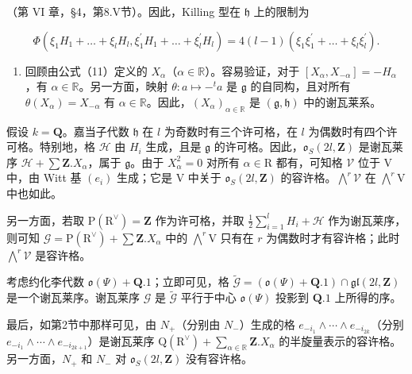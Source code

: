 （第 VI 章，§4，第8.V节）。因此，Killing 型在 \(\mathfrak{h}\) 上的限制为

\[
\Phi \left(\xi_ {1} H _ {1} + \dots + \xi_ {l} H _ {l}, \xi_ {1} ^ {\prime} H _ {1} + \dots + \xi_ {l} ^ {\prime} H _ {l}\right) = 4 (l - 1) \left(\xi_ {1} \xi_ {1} ^ {\prime} + \dots + \xi_ {l} \xi_ {l} ^ {\prime}\right).
\]

\begin{enumerate}
\def\labelenumi{(\Roman{enumi})}
\setcounter{enumi}{8}
\tightlist
\item
回顾由公式（11）定义的 \(X_{\alpha}\)（\(\alpha \in \mathbb{R}\)）。容易验证，对于 \([X_{\alpha}, X_{-\alpha}] = -H_{\alpha}\)，有 \(\alpha \in \mathbb{R}\)。另一方面，映射 \(\theta : a \mapsto -^{t}a\) 是 \(\mathfrak{g}\) 的自同构，且对所有 \(\theta(X_{\alpha}) = X_{-\alpha}\) 有 \(\alpha \in \mathbb{R}\)。因此，\((X_{\alpha})_{\alpha \in \mathbb{R}}\) 是 \((\mathfrak{g}, \mathfrak{h})\) 中的谢瓦莱系。
\end{enumerate}

假设 \(k = \mathbf{Q}\)。嘉当子代数 \(\mathfrak{h}\) 在 \(l\) 为奇数时有三个许可格，在 \(l\) 为偶数时有四个许可格。特别地，格 \(\mathcal{H}\) 由 \(H_i\) 生成，且是 \(\mathfrak{g}\) 的许可格。因此，\(\mathfrak{o}_S(2l,\mathbf{Z})\) 是谢瓦莱序 \(\mathcal{H} + \sum \mathbf{Z}.X_\alpha\)，属于 \(\mathfrak{g}\)。由于 \(X_{\alpha}^{2} = 0\) 对所有 \(\alpha \in \mathrm{R}\) 都有，可知格 \(\mathcal{V}\) 位于 \(\mathrm{V}\) 中，由 Witt 基 \((e_i)\) 生成；它是 \(\mathrm{V}\) 中关于 \(\mathfrak{o}_S(2l,\mathbf{Z})\) 的容许格。\(\bigwedge^r\mathcal{V}\) 在 \(\bigwedge^r\mathrm{V}\) 中也如此。

另一方面，若取 \(\mathrm{P}(\mathrm{R}^{\vee}) = \mathbf{Z}\) 作为许可格，并取 \(\frac{1}{2} \sum_{i=1}^{l} H_i + \mathcal{H}\) 作为谢瓦莱序，则可知 \(\mathcal{G} = \mathrm{P}(\mathrm{R}^{\vee}) + \sum \mathbf{Z}. X_{\alpha}\) 中的 \(\bigwedge^r \mathrm{V}\) 只有在 \(r\) 为偶数时才有容许格；此时 \(\bigwedge^r \mathcal{V}\) 是容许格。

考虑约化李代数 \(\mathfrak{o}(\varPsi) + \mathbf{Q}.1\)；立即可见，格 \(\tilde{\mathcal{G}} = (\mathfrak{o}(\varPsi) + \mathbf{Q}.1) \cap \mathfrak{gl}(2l, \mathbf{Z})\) 是一个谢瓦莱序。谢瓦莱序 \(\mathcal{G}\) 是 \(\tilde{\mathcal{G}}\) 平行于中心 \(\mathfrak{o}(\varPsi)\) 投影到 \(\mathbf{Q}.1\) 上所得的序。

最后，如第2节中那样可见，由 \(N_{+}\)（分别由 \(N_{-}\)）生成的格 \(e_{-i_{1}}\wedge\cdots\wedge e_{-i_{2k}}\)（分别 \(e_{-i_{1}}\wedge\cdots\wedge e_{-i_{2k+1}}\)）是谢瓦莱序 \(\mathrm{Q}(\mathrm{R}^{\vee})+\sum_{\alpha\in\mathbb{R}}\mathbf{Z}.X_{\alpha}\) 的半旋量表示的容许格。另一方面，\(N_{+}\) 和 \(N_{-}\) 对 \(\mathfrak{o}_{S}(2l,\mathbf{Z})\) 没有容许格。

